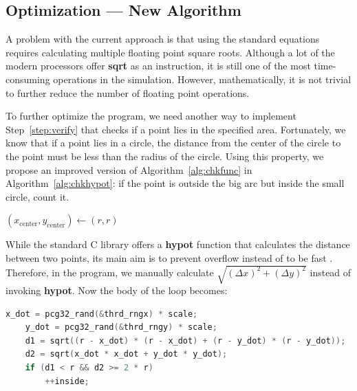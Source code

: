 \documentclass[a4paper]{article}
\begin{document}
\subsection{Optimization --- New Algorithm}
A problem with the current approach is that using the standard equations requires calculating multiple floating point square roots. Although a lot of the modern processors offer \textbf{sqrt} as an instruction, it is still one of the most time-consuming operations in the simulation. However, mathematically, it is not trivial to further reduce the number of floating point operations.

To further optimize the program, we need another way to implement Step~\ref{step:verify} that checks if a point lies in the specified area. Fortunately, we know that if a point lies in a circle, the distance from the center of the circle to the point must be less than the radius of the circle. Using this property, we propose an improved version of Algorithm~\ref{alg:chkfunc} in Algorithm~\ref{alg:chkhypot}: if the point is outside the big arc but inside the small circle, count it.

\begin{algorithm}[hp]
    \caption{Point checking based on the length of the hypotenuse}\label{alg:chkhypot}
    \begin{algorithmic}[1]
            \State{} \((x_\text{center}, y_\text{center}) \gets (r, r)\)
                \State{}
            \EndIf{}\\
            \State{}
        \EndProcedure{}
    \end{algorithmic}
\end{algorithm}

While the standard C library offers a \textbf{hypot} function that calculates the distance between two points, its main aim is to prevent overflow instead of to be fast \autocite{iso9899}. Therefore, in the program, we manually calculate \(\sqrt{{(\Delta x)}^2 + {(\Delta y)}^2}\) instead of invoking \textbf{hypot}. Now the body of the loop becomes:
\begin{lstlisting}[language=C]
    x_dot = pcg32_rand(&thrd_rngx) * scale;
    y_dot = pcg32_rand(&thrd_rngy) * scale;
    d1 = sqrt((r - x_dot) * (r - x_dot) + (r - y_dot) * (r - y_dot));
    d2 = sqrt(x_dot * x_dot + y_dot * y_dot);
    if (d1 < r && d2 >= 2 * r)
        ++inside;
\end{lstlisting}
\end{document}
